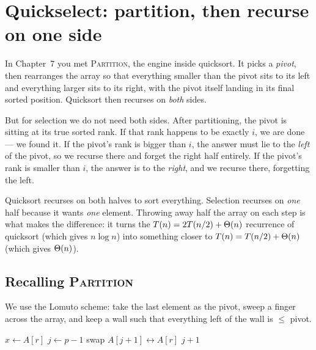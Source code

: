 \section{Quickselect: partition, then recurse on one side}

In Chapter~7 you met \textsc{Partition}, the engine inside quicksort. It picks a \emph{pivot}, then rearranges the array so that
everything smaller than the pivot sits to its left and everything larger sits to
its right, with the pivot itself landing in its final sorted position. Quicksort
then recurses on \emph{both} sides.

But for selection we do not need both sides. After partitioning, the pivot is
sitting at its true sorted rank. If that rank happens to be exactly $i$, we are
done --- we found it. If the pivot's rank is bigger than $i$, the answer must lie
to the \emph{left} of the pivot, so we recurse there and forget the right half
entirely. If the pivot's rank is smaller than $i$, the answer is to the
\emph{right}, and we recurse there, forgetting the left.

\begin{intuitionbox}
Quicksort recurses on both halves to sort everything.
Selection recurses on \emph{one} half because it wants \emph{one} element. Throwing
away half the array on each step is what makes the difference: it turns the
$T(n) = 2T(n/2) + \Theta(n)$ recurrence of quicksort (which gives $n\log n$) into
something closer to $T(n) = T(n/2) + \Theta(n)$ (which gives $\Theta(n)$).
\end{intuitionbox}

\subsection{Recalling \textsc{Partition}}

We use the Lomuto scheme: take the last element as the pivot, sweep a finger across the
array, and keep a wall such that everything left of the wall is $\le$ pivot.

\begin{algorithm}[H]
\caption{\textsc{Partition}$(A, p, r)$}\label{ch09:alg-partition}
$x \gets A[r]$ 
$j \gets p - 1$ 
swap $A[j+1] \leftrightarrow A[r]$ 
\Return $j + 1$\;
\end{algorithm}

